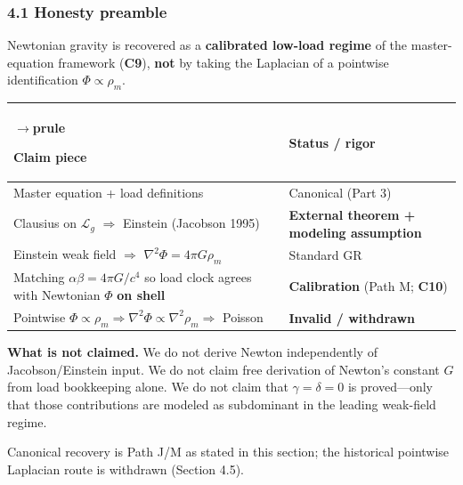 \documentclass[
  11pt,
]{article}
\newcounter{none} %
\begin{document}
\subsubsection{4.1 Honesty preamble}\label{honesty-preamble}

Newtonian gravity is recovered as a \textbf{calibrated low-load regime} of the master-equation framework (\textbf{C9}), \textbf{not} by taking the Laplacian of a pointwise identification \(\Phi\propto\rho_m\).

{\def\LTcaptype{none} %
\begin{longtable}[]{@{}
  >{\raggedright\arraybackslash}p{}
  >{\raggedright\arraybackslash}p{}@{}}
$\rightarrow$prule\noalign{}
\begin{minipage}[b]{\linewidth}\raggedright
Claim piece
\end{minipage} & \begin{minipage}[b]{\linewidth}\raggedright
Status / rigor
\end{minipage} \\
\midrule\noalign{}
\endhead
\bottomrule\noalign{}
\endlastfoot
Master equation + load definitions & Canonical (Part 3) \\
Clausius on \(\mathcal{L}_g\) \(\Rightarrow\) Einstein (Jacobson 1995) & \textbf{External theorem + modeling assumption} \\
Einstein weak field \(\Rightarrow\) \(\nabla^2\Phi=4\pi G\rho_m\) & Standard GR \\
Matching \(\alpha\beta=4\pi G/c^4\) so load clock agrees with Newtonian \(\Phi\) \textbf{on shell} & \textbf{Calibration} (Path M; \textbf{C10}) \\
Pointwise \(\Phi\propto\rho_m\Rightarrow\nabla^2\Phi\propto\nabla^2\rho_m\Rightarrow\) Poisson & \textbf{Invalid / withdrawn} \\
\end{longtable}
}

\textbf{What is not claimed.} We do not derive Newton independently of Jacobson/Einstein input. We do not claim free derivation of Newton's constant \(G\) from load bookkeeping alone. We do not claim that \(\gamma=\delta=0\) is proved---only that those contributions are modeled as subdominant in the leading weak-field regime.

Canonical recovery is Path J/M as stated in this section; the historical pointwise Laplacian route is withdrawn (Section 4.5).
\end{document}
